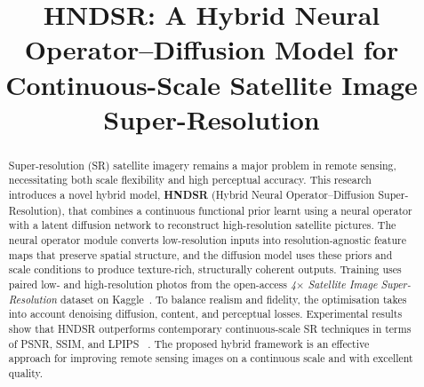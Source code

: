 \documentclass[conference]{IEEEtran}
\begin{document}
\title{HNDSR: A Hybrid Neural Operator--Diffusion Model for Continuous-Scale Satellite Image Super-Resolution}

\author{

}

\maketitle

\begin{abstract}
Super-resolution (SR) satellite imagery remains a major problem in remote sensing, necessitating both scale flexibility and high perceptual accuracy.  This research introduces a novel hybrid model, \textbf{HNDSR} (Hybrid Neural Operator--Diffusion Super-Resolution), that combines a continuous functional prior learnt using a neural operator with a latent diffusion network to reconstruct high-resolution satellite pictures.  The neural operator module converts low-resolution inputs into resolution-agnostic feature maps that preserve spatial structure, and the diffusion model uses these priors and scale conditions to produce texture-rich, structurally coherent outputs.  Training uses paired low- and high-resolution photos from the open-access \textit{4$\times$ Satellite Image Super-Resolution} dataset on Kaggle~\cite{tudela2023dataset}.  To balance realism and fidelity, the optimisation takes into account denoising diffusion, content, and perceptual losses. Experimental results show that HNDSR outperforms contemporary continuous-scale SR techniques in terms of PSNR, SSIM, and LPIPS ~\cite{neurOpDiff, e2diffsr}.  The proposed hybrid framework is an effective approach for improving remote sensing images on a continuous scale and with excellent quality.
\end{abstract}
\end{document}
